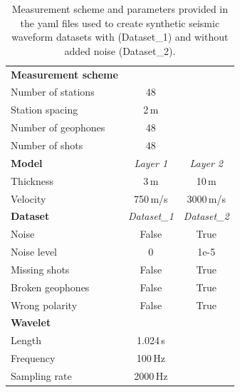 \documentclass[a4paper,fleqn]{cas-sc}
\begin{document}
\begin{table}[]
    \caption{Measurement scheme and parameters provided in the yaml files used to create synthetic seismic waveform datasets with (Dataset\_1) and without added noise (Dataset\_2).}
    \centering
    \begin{tabular}{lcc}
        \toprule
        \textbf{Measurement scheme} & & \\
        Number of stations & 48 & \\
        Station spacing & 2\,m & \\
        Number of geophones & 48 & \\
        Number of shots & 48 & \\
        \midrule
        \textbf{Model} & \textit{Layer 1} & \textit{Layer 2} \\
		Thickness & 3\,m & 10\,m \\
        Velocity & 750\,m/s & 3000\,m/s \\
        \midrule
        \textbf{Dataset} & \textit{Dataset\_1} & \textit{Dataset\_2} \\
		Noise & False & True \\
		Noise level & 0 & 1e-5 \\
		Missing shots & False & True \\
		Broken geophones & False & True \\
		Wrong polarity & False & True \\
		\midrule
		\textbf{Wavelet} & & \\
		Length & 1.024\,s & \\
		Frequency & 100\,Hz & \\
		Sampling rate & 2000\,Hz & \\
        \bottomrule
    \end{tabular}
    \label{tab:syndata}
\end{table}
\end{document}
